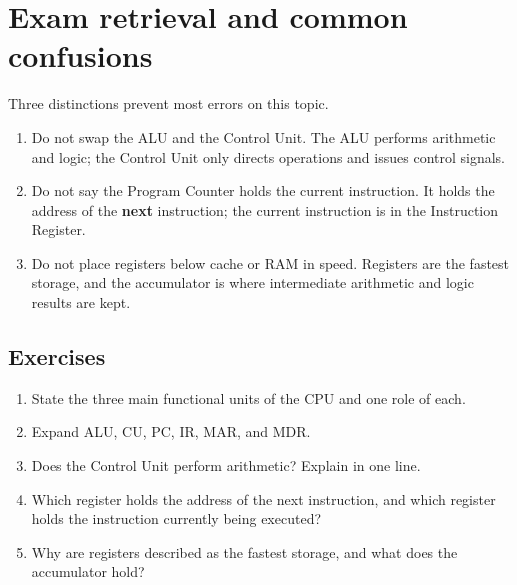 \section{Exam retrieval and common confusions}
Three distinctions prevent most errors on this topic.
\begin{enumerate}
  \item Do not swap the ALU and the Control Unit. The ALU performs
    arithmetic and logic; the Control Unit only directs operations and
    issues control signals.
  \item Do not say the Program Counter holds the current instruction. It
    holds the address of the \textbf{next} instruction; the current
    instruction is in the Instruction Register.
  \item Do not place registers below cache or RAM in speed. Registers are
    the fastest storage, and the accumulator is where intermediate
    arithmetic and logic results are kept.
\end{enumerate}

\subsection*{Exercises}
\begin{enumerate}[label=\arabic*.]
  \item State the three main functional units of the CPU and one role of
    each.
  \item Expand ALU, CU, PC, IR, MAR, and MDR.
  \item Does the Control Unit perform arithmetic? Explain in one line.
  \item Which register holds the address of the next instruction, and which
    register holds the instruction currently being executed?
  \item Why are registers described as the fastest storage, and what does
    the accumulator hold?
\end{enumerate}

